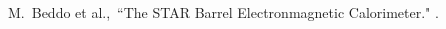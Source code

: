 \begin{thebibliography}{1000}

M.~Beddo et al.,~``The STAR Barrel Electronmagnetic Calorimeter." .

\end{thebibliography}
